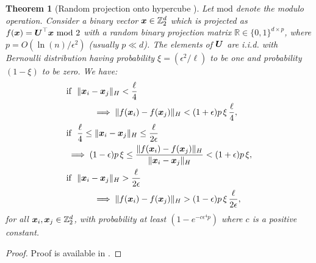 \documentclass{article}
\newtheorem{theorem}{Theorem}
\def\b{\ensuremath\boldsymbol}
\begin{document}
\begin{theorem}[Random projection onto hypercube \cite{kushilevitz1998algorithm,kushilevitz2000efficient}]\label{theorem_random_projection_hypercube}
Let $\text{mod}$ denote the modulo operation.
Consider a binary vector $\b{x} \in \mathbb{Z}^d_2$ which is projected as $f(\b{x}) = \b{U}^\top \b{x} \text{ mod } 2$ with a random binary projection matrix $\mathbb{R} \in \{0,1\}^{d \times p}$, where $p = O(\ln(n) / \epsilon^2)$ (usually $p \ll d$). The elements of $\b{U}$ are i.i.d. with Bernoulli distribution having probability $\xi = (\epsilon^2 / \ell)$ to be one and probability $(1-\xi)$ to be zero. We have:
\begin{align}
& \text{if }\,\, \|\b{x}_i - \b{x}_j\|_H < \frac{\ell}{4} \nonumber\\
&\quad\quad\quad\implies \|f(\b{x}_i) - f(\b{x}_j)\|_H < (1+\epsilon)p\,\xi\,\frac{\ell}{4}, \\
& \text{if }\,\, \frac{\ell}{4} \leq \|\b{x}_i - \b{x}_j\|_H \leq \frac{\ell}{2\epsilon} \nonumber\\
&\implies (1-\epsilon)p\,\xi\leq\frac{\|f(\b{x}_i) - f(\b{x}_j)\|_H}{\|\b{x}_i - \b{x}_j\|_H} < (1+\epsilon)p\,\xi, \\
& \text{if }\,\, \|\b{x}_i - \b{x}_j\|_H > \frac{\ell}{2\epsilon} \nonumber\\
&\quad\quad\quad\implies \|f(\b{x}_i) - f(\b{x}_j)\|_H > (1-\epsilon)p\,\xi\,\frac{\ell}{2\epsilon},
\end{align}
for all $\b{x}_i, \b{x}_j \in \mathbb{Z}^d_2$, with probability at least $(1-e^{-c \epsilon^4 p})$ where $c$ is a positive constant. 
\end{theorem}
\begin{proof}
Proof is available in \cite{vempala2005random,liberty2006random}.
\end{proof}

\end{document}

